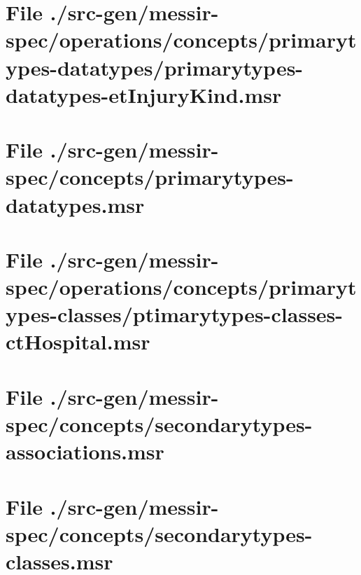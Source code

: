 \section[File /src-gen/messir-spec/operations.../primarytypes-datatypes-etInjuryKind.msr]{File ./src-gen/messir-spec/operations/concepts/primarytypes-datatypes/primarytypes-datatypes-etInjuryKind.msr}
\scriptsize

\normalsize
	
\section[File /src-gen/messir-spec/concepts/primarytypes-datatypes.msr]{File ./src-gen/messir-spec/concepts/primarytypes-datatypes.msr}
\scriptsize

\normalsize
	
\section[File /src-gen/messir-spec/operations.../ptimarytypes-classes-ctHospital.msr]{File ./src-gen/messir-spec/operations/concepts/primarytypes-classes/ptimarytypes-classes-ctHospital.msr}
\scriptsize

\normalsize
	
\section[File /src-gen/messir-spec/concepts/secondarytypes-associations.msr]{File ./src-gen/messir-spec/concepts/secondarytypes-associations.msr}
\scriptsize

\normalsize
	
\section[File /src-gen/messir-spec/concepts/secondarytypes-classes.msr]{File ./src-gen/messir-spec/concepts/secondarytypes-classes.msr}
\scriptsize

\normalsize
	
